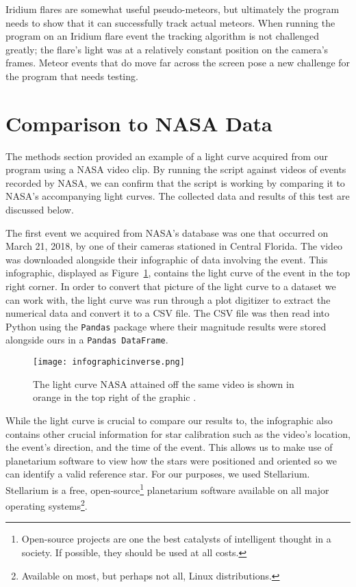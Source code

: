 Iridium flares are somewhat useful pseudo-meteors, but ultimately the program needs to show that it can successfully track actual meteors. When running the program on an Iridium flare event the tracking algorithm is not challenged greatly; the flare's light was at a relatively constant position on the camera's frames. Meteor events that do move far across the screen pose a new challenge for the program that needs testing.

\section{Comparison to NASA Data}

The methods section provided an example of a light curve acquired from our program using a NASA video clip. By running the script against videos of events recorded by NASA, we can confirm that the script is working by comparing it to NASA's accompanying light curves. The collected data and results of this test are discussed below.

The first event we acquired from NASA's database was one that occurred on March 21, 2018, by one of their cameras stationed in Central Florida. The video was downloaded alongside their infographic of data involving the event. This infographic, displayed as Figure~\ref{fig:infographic}, contains the light curve of the event in the top right corner. In order to convert that picture of the light curve to a dataset we can work with, the light curve was run through a plot digitizer to extract the numerical data and convert it to a CSV file. The CSV file was then read into Python using the \texttt{Pandas} package where their magnitude results were stored alongside ours in a \texttt{Pandas DataFrame}.

\begin{figure}[ht!]
	\centering
	\texttt{[image: infographicinverse.png]}
	\caption{The light curve NASA attained off the same video is shown in orange in the top right of the graphic \protect\cite{NASA2018}.}
	\label{fig:infographic}
\end{figure}

While the light curve is crucial to compare our results to, the infographic also contains other crucial information for star calibration such as the video's location, the event's direction, and the time of the event. This allows us to make use of planetarium software to view how the stars were positioned and oriented so we can identify a valid reference star. For our purposes, we used Stellarium. Stellarium is a free, open-source\footnote{Open-source projects are one the best catalysts of intelligent thought in a society. If possible, they should be used at all costs.} planetarium software available on all major operating systems\footnote{Available on most, but perhaps not all, Linux distributions.}.

